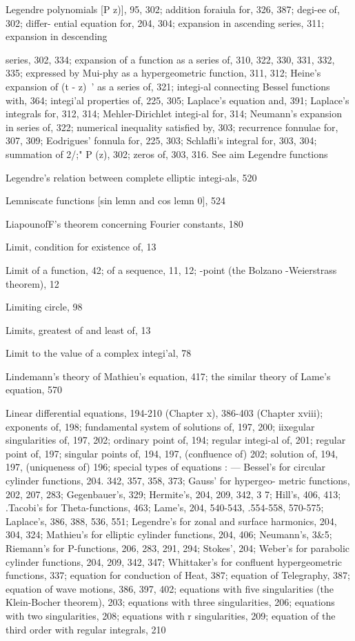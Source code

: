 Legendre polynomials [P   z)], 95, 302; addition foraiula for, 326, 387; degi-ee of, 302; differ-
ential equation for, 204, 304; expansion in ascending series, 311; expansion in descending

%
%

series, 302, 334; expansion of a function as a series of, 310, 322, 330, 331, 332, 335;
expressed by Mui-phy as a hypergeometric function, 311, 312; Heine's expansion of (t - z)~'
as a series of, 321; integi-al connecting Bessel functions with, 364; integi'al properties of,
225, 305; Laplace's equation and, 391; Laplace's integrals for, 312, 314; Mehler-Dirichlet
integi-al for, 314; Neumann's expansion in series of, 322; numerical inequality satisfied by,
303; recurrence fonnulae for, 307, 309; Eodrigues' fonnula for, 225, 303; Schlafli's integral
for, 303, 304; summation of 2/;" P  (z), 302; zeros of, 303, 316. See aim Legendre functions

Legendre's relation between complete elliptic integi-als, 520

Lemniscate functions [sin lemn and cos lemn 0], 524

LiapounofF's theorem concerning Fourier constants, 180

Limit, condition for existence of, 13

Limit of a function, 42; of a sequence, 11, 12; -point (the Bolzano -Weierstrass theorem), 12

Limiting circle, 98

Limits, greatest of and least of, 13

Limit to the value of a complex integi'al, 78

Lindemann's theory of Mathieu's equation, 417; the similar theory of Lame's equation, 570

Linear differential equations, 194-210 (Chapter x), 386-403 (Chapter xviii); exponents of, 198;
fundamental system of solutions of, 197, 200; iixegular singularities of, 197, 202; ordinary
point of, 194; regular integi-al of, 201; regular point of, 197; singular points of, 194, 197,
(confluence of) 202; solution of, 194, 197, (uniqueness of) 196; special types of equations :
— Bessel's for circular cylinder functions, 204. 342, 357, 358, 373; Gauss' for hypergeo-
metric functions, 202, 207, 283; Gegenbauer's, 329; Hermite's, 204, 209, 342, 3 7; Hill's,
406, 413; .Tacobi's for Theta-functions, 463; Lame's, 204, 540-543, .554-558, 570-575;
Laplace's, 386, 388, 536, 551; Legendre's for zonal and surface harmonics, 204, 304, 324;
Mathieu's for elliptic cylinder functions, 204, 406; Neumann's, 3\&5; Riemann's for
P-functions, 206, 283, 291, 294; Stokes', 204; Weber's for parabolic cylinder functions,
204, 209, 342, 347; Whittaker's for confluent hypergeometric functions, 337; equation for
conduction of Heat, 387; equation of Telegraphy, 387; equation of wave motions, 386, 397,
402; equations with five singularities (the Klein-Bocher theorem), 203; equations with three
singularities, 206; equations with two singularities, 208; equations with r singularities,
209; equation of the third order with regular integrals, 210


